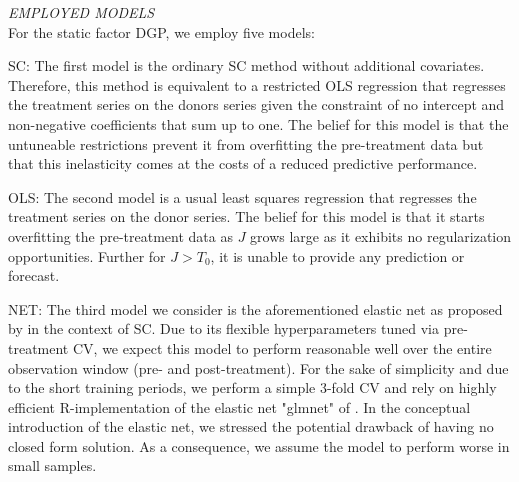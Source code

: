 \textit{EMPLOYED MODELS} \\
For the static factor \ac{DGP}, we employ five models: 

SC: The first model is the ordinary \ac{SC} method without additional covariates. Therefore, this method is equivalent to a restricted \ac{OLS} regression that regresses the treatment series on the donors series given the constraint of no intercept and non-negative coefficients that sum up to one. The belief for this model is that the untuneable restrictions prevent it from overfitting the pre-treatment data but that this inelasticity comes at the costs of a reduced predictive performance.

OLS: The second model is a usual least squares regression that regresses the treatment series on the donor series. The belief for this model is that it starts overfitting the pre-treatment data as $J$ grows large as it exhibits no regularization opportunities. Further for $J > T_0$, it is unable to provide any prediction or forecast.

NET: The third model we consider is the aforementioned elastic net as proposed by \cite{doudchenko:2016} in the context of \ac{SC}. Due to its flexible hyperparameters tuned via pre-treatment \ac{CV}, we expect this model to perform reasonable well over the entire observation window (pre- and post-treatment). For the sake of simplicity and due to the short training periods, we perform a simple 3-fold \ac{CV} and rely on highly efficient R-implementation of the elastic net "glmnet" of \cite{friedman:2010}. In the conceptual introduction of the elastic net, we stressed the potential drawback of having no closed form solution. As a consequence, we assume the model to perform worse in small samples.

